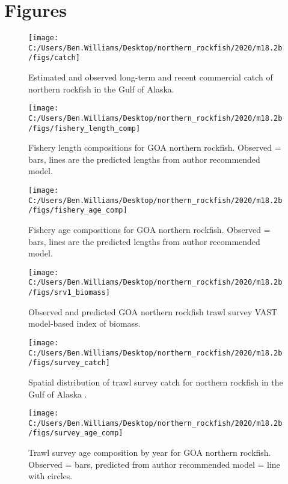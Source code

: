 \documentclass[
  11pt,
]{article}
\begin{document}
\hypertarget{figures}{%
\section{Figures}\label{figures}}

\begin{figure}
\texttt{[image: C:/Users/Ben.Williams/Desktop/northern\_rockfish/2020/m18.2b/figs/catch]} \caption{Estimated and observed long-term and recent commercial catch of northern rockfish in the Gulf of Alaska.}\label{fig:fig1}
\end{figure}

\begin{figure}
\texttt{[image: C:/Users/Ben.Williams/Desktop/northern\_rockfish/2020/m18.2b/figs/fishery\_length\_comp]} \caption{Fishery length compositions for GOA northern rockfish. Observed = bars, lines are the predicted lengths from author recommended model.}\label{fig:fig2}
\end{figure}

\begin{figure}
\texttt{[image: C:/Users/Ben.Williams/Desktop/northern\_rockfish/2020/m18.2b/figs/fishery\_age\_comp]} \caption{Fishery age compositions for GOA northern rockfish. Observed = bars, lines are the predicted lengths from author recommended model.}\label{fig:fig3}
\end{figure}

\begin{figure}
\texttt{[image: C:/Users/Ben.Williams/Desktop/northern\_rockfish/2020/m18.2b/figs/srv1\_biomass]} \caption{Observed and predicted GOA northern rockfish trawl survey VAST model-based index of biomass.}\label{fig:fig4}
\end{figure}

\begin{figure}
\texttt{[image: C:/Users/Ben.Williams/Desktop/northern\_rockfish/2020/m18.2b/figs/survey\_catch]} \caption{Spatial distribution of trawl survey catch for northern rockfish in the Gulf of Alaska .}\label{fig:fig5}
\end{figure}

\begin{figure}
\texttt{[image: C:/Users/Ben.Williams/Desktop/northern\_rockfish/2020/m18.2b/figs/survey\_age\_comp]} \caption{Trawl survey age composition by year for GOA northern rockfish. Observed = bars, predicted from author recommended model = line with circles.}\label{fig:fig6}
\end{figure}
\end{document}
